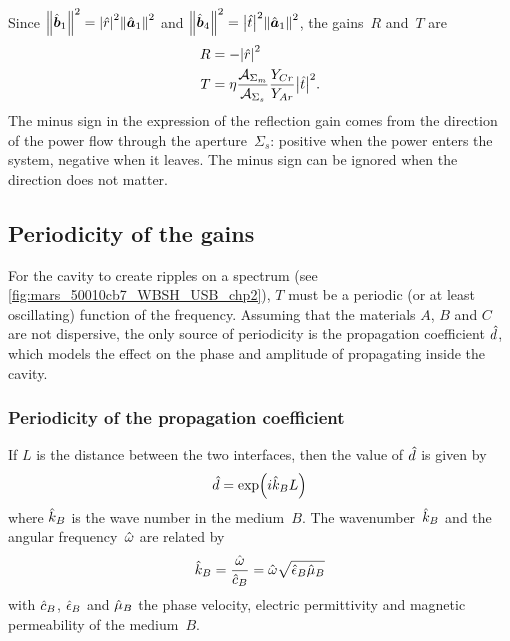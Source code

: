 Since $\norm{\vectcp{b}_1}^2 = \abs{\cp{r}}^2 \norm{\vectcp{a}_1}^2$
and   $\norm{\vectcp{b}_4}^2 = \abs{\cp{t}}^2 \norm{\vectcp{a}_1}^2$,
the gains~$R$ and~$T$ are
\begin{align}
    R
    &=
    -\abs{\cp{r}}^2
    \label{eq:fabry_gain_r}
    \\%
    T
    &=
    \eta
    \frac{\mathcal{A}_{\Sigma_m}}{\mathcal{A}_{\Sigma_s}}
    \frac{Y_{Cr}}{Y_{Ar}}
    \abs{\cp{t}}^2
    \text{.}
    \label{eq:fabry_gain_t}
\end{align}
The minus sign in the expression of the reflection gain comes from the direction of the power flow through the aperture~$\Sigma_s$: positive when the power enters the system, negative when it leaves.
The minus sign can be ignored when the direction does not matter.






\subsection{Periodicity of the gains}
\label{sec:periodicity_in_power}

For the cavity to create ripples on a spectrum (see \vref{fig:mars_50010cb7_WBSH_USB_chp2}), $T$ must be a periodic (or at least oscillating) function of the frequency.
Assuming that the materials $A$, $B$ and $C$ are not dispersive, the only source of periodicity is the propagation coefficient $\hat{d}$, which models the effect on the phase and amplitude of propagating inside the cavity.



\subsubsection{Periodicity of the propagation coefficient}

If $L$ is the distance between the two interfaces, then the value of $\hat{d}$ is given by
\begin{equation}
    \cp{d} = \exp \left( i\cp{k}_B L \right) \label{eq:cavity_s_k}
\end{equation}
where $\hat{k}_B$ is the wave number in the medium~$B$.
The wavenumber~$\hat{k}_B$ and the angular frequency~$\hat{\omega}$ are related by
\begin{equation}
    \hat{k}_B
    =
    \frac{\hat{\omega}}{\hat{c}_B}
    =
    \hat{\omega} \sqrt{\hat{\epsilon}_B \hat{\mu}_B}
\end{equation}
with $\hat{c}_B$, $\hat{\epsilon}_B$ and $\hat{\mu}_B$ the phase velocity, electric permittivity and magnetic permeability of the medium~$B$.

